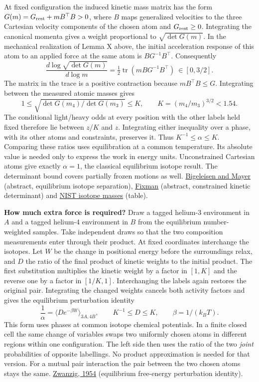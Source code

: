 \documentclass[11pt,a4paper]{article}
\begin{document}
At fixed configuration the induced kinetic mass matrix has the form
\(G(m)=G_{\rm rest}+mB^\top B>0\), where \(B\) maps generalized
velocities to the three Cartesian velocity components of the chosen atom
and \(G_{\rm rest}\ge0\). Integrating the canonical momenta gives a
weight proportional to \(\sqrt{\det G(m)}\). In the mechanical
realization of Lemma X above, the initial acceleration response of this
atom to an applied force at the same atom is \(BG^{-1}B^\top\).
Consequently \[
 \frac{d\log\sqrt{\det G(m)}}{d\log m}
    =\tfrac12\operatorname{tr}(mBG^{-1}B^\top)\ \in[0,3/2].
\] The matrix in the trace is a positive contraction because
\(mB^\top B\le G\). Integrating between the measured atomic masses gives
\[
 1\le\sqrt{\det G(m_4)/\det G(m_3)}\le K,\qquad
 K=(m_4/m_3)^{3/2}<1.54 .
\] The conditional light/heavy odds at every position with the other
labels held fixed therefore lie between \(z/K\) and \(z\). Integrating
either inequality over a phase, with its other atoms and constraints,
preserves it. Thus \(K^{-1}\le\alpha\le K\). Comparing these ratios uses
equilibration at a common temperature. Its absolute value is needed only
to express the work in energy units. Unconstrained Cartesian atoms give
exactly \(\alpha=1\), the classical equilibrium isotope result. The
determinant bound covers partially frozen motions as well.
\href{https://doi.org/10.1063/1.1746492}{Bigeleisen and Mayer}
(abstract, equilibrium isotope separation),
\href{https://doi.org/10.1073/pnas.71.8.3050}{Fixman} (abstract,
constrained kinetic determinant) and
\href{https://physics.nist.gov/cgi-bin/Compositions/stand_alone.pl?ele=He}{NIST
isotope masses} (table).

\textbf{How much extra force is required?} Draw a tagged helium-3
environment in \(A\) and a tagged helium-4 environment in \(B\) from the
equilibrium number-weighted samples. Take independent draws so that the
two composition measurements enter through their product. At fixed
coordinates interchange the isotopes. Let \(W\) be the change in
positional energy before the surroundings relax, and \(D\) the ratio of
the final product of kinetic weights to the initial product. The first
substitution multiplies the kinetic weight by a factor in \([1,K]\) and
the reverse one by a factor in \([1/K,1]\). Interchanging the labels
again restores the original pair. Integrating the changed weights
cancels both activity factors and gives the equilibrium perturbation
identity \[
 \frac1\alpha=\big\langle D e^{-\beta W}\big\rangle_{3A,4B},
 \qquad K^{-1}\le D\le K,\qquad \beta=1/(k_BT).
\] This form uses phases at common isotope chemical potentials. In a
finite closed cell the same change of variables swaps two uniformly
chosen atoms in different regions within one configuration. The left
side then uses the ratio of the two \emph{joint} probabilities of
opposite labellings. No product approximation is needed for that
version. For a mutual pair interaction the pair between the two chosen
atoms stays the same. \href{https://doi.org/10.1063/1.1740409}{Zwanzig,
1954} (equilibrium free-energy perturbation identity).
\end{document}
